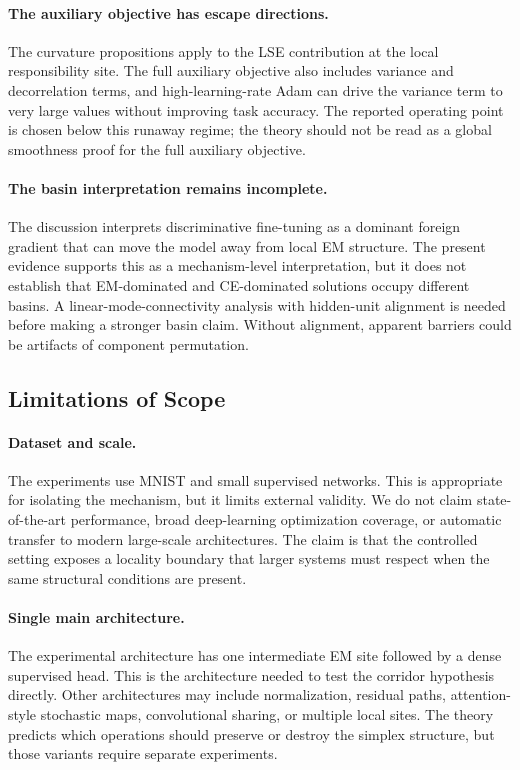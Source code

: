 \paragraph{The auxiliary objective has escape directions.}
The curvature propositions apply to the LSE contribution at the local
responsibility site. The full auxiliary objective also includes variance and
decorrelation terms, and high-learning-rate Adam can drive the variance term
to very large values without improving task accuracy. The reported operating
point is chosen below this runaway regime; the theory should not be read as a
global smoothness proof for the full auxiliary objective.

\paragraph{The basin interpretation remains incomplete.}
The discussion interprets discriminative fine-tuning as a dominant foreign
gradient that can move the model away from local EM structure. The present
evidence supports this as a mechanism-level interpretation, but it does not
establish that EM-dominated and CE-dominated solutions occupy different
basins. A linear-mode-connectivity analysis with hidden-unit alignment is
needed before making a stronger basin claim. Without alignment, apparent
barriers could be artifacts of component permutation.

\subsection{Limitations of Scope}
\paragraph{Dataset and scale.}
The experiments use MNIST and small supervised networks. This is appropriate
for isolating the mechanism, but it limits external validity. We do not claim
state-of-the-art performance, broad deep-learning optimization coverage, or
automatic transfer to modern large-scale architectures. The claim is that the
controlled setting exposes a locality boundary that larger systems must
respect when the same structural conditions are present.

\paragraph{Single main architecture.}
The experimental architecture has one intermediate EM site followed by a dense
supervised head. This is the architecture needed to test the corridor
hypothesis directly. Other architectures may include normalization, residual
paths, attention-style stochastic maps, convolutional sharing, or multiple
local sites. The theory predicts which operations should preserve or destroy
the simplex structure, but those variants require separate experiments.

